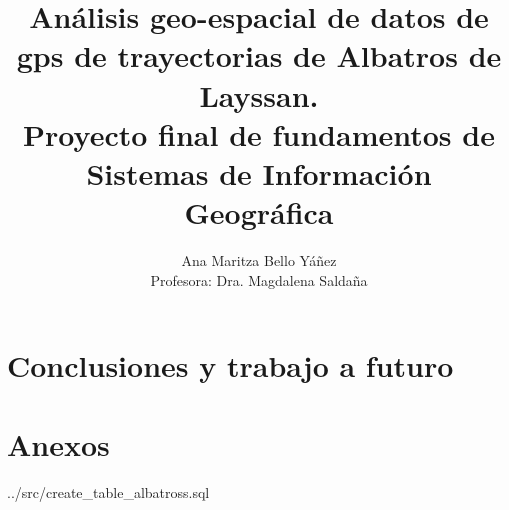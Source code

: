 \documentclass[a4paper, 11pt]{article}
\title{ Análisis geo-espacial de datos de gps de trayectorias de Albatros de
Layssan. \\
Proyecto final de fundamentos de Sistemas de Información Geográfica \\
}
\author{Ana Maritza Bello Yáñez \\ Profesora: Dra. Magdalena Saldaña}
\begin{document}
\maketitle
\tableofcontents









\clearpage
\section{Conclusiones y trabajo a futuro}

\clearpage
\pagebreak
 


\pagebreak
\section{Anexos}

 {../src/create_table_albatross.sql}
\end{document}
